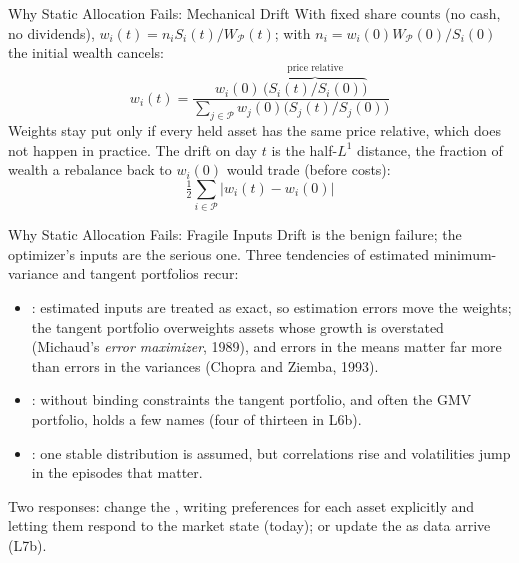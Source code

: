 \documentclass[aspectratio=169,11pt]{beamer}
\newcommand{\WP}{W_{\mathcal{P}}}
\begin{document}
\begin{frame}{Why Static Allocation Fails: Mechanical Drift}
  With fixed share counts (no cash, no dividends), $w_i(t)=n_iS_i(t)/\WP(t)$; with
  $n_i=w_i(0)\WP(0)/S_i(0)$ the initial wealth cancels:
  \[
    w_i(t)=\frac{w_i(0)\,\overbrace{\bigl(S_i(t)/S_i(0)\bigr)}^{\text{price relative}}}
      {\sum_{j\in\mathcal P}w_j(0)\bigl(S_j(t)/S_j(0)\bigr)}
  \]
  Weights stay put only if every held asset has the same price relative, which
  does not happen in practice. The drift on day $t$ is the half-$L^1$ distance,
  the fraction of wealth a rebalance back to $w_i(0)$ would trade (before costs):
  \[
    \tfrac12\sum_{i\in\mathcal P}\lvert w_i(t)-w_i(0)\rvert
  \]
\end{frame}

\begin{frame}{Why Static Allocation Fails: Fragile Inputs}
  Drift is the benign failure; the optimizer's inputs are the serious one. Three
  tendencies of estimated minimum-variance and tangent portfolios recur:
  \begin{itemize}\setlength{\itemsep}{0.45em}
    \item {}: estimated inputs are treated as exact, so
      estimation errors move the weights; the tangent portfolio overweights assets
      whose growth is overstated (Michaud's \emph{error maximizer}, 1989), and
      errors in the means matter far more than errors in the variances (Chopra and
      Ziemba, 1993).
    \item {}: without binding constraints the tangent
      portfolio, and often the GMV portfolio, holds a few names (four of thirteen
      in L6b).
    \item {}: one stable distribution is assumed, but
      correlations rise and volatilities jump in the episodes that matter.
  \end{itemize}
  Two responses: change the , writing preferences for each
  asset explicitly and letting them respond to the market state (today); or
  update the  as data arrive (L7b).
\end{frame}
\end{document}

